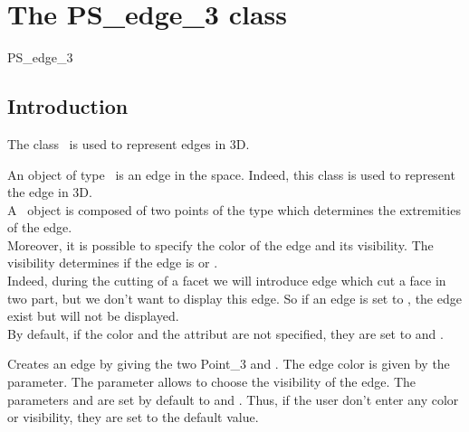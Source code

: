 
\chapter{The PS\_edge\_3 class}

\begin{ccClass} {PS_edge_3}

\section{Introduction}

The class \ccClassName\ is used to represent edges in 3D.

\ccDefinition 

	An object of type \ccClassName\ is an edge in the space.
Indeed, this class is used to represent the edge in 3D. \\
A \ccClassName\ object is composed of two points of the  type which determines
the extremities of the edge. \\
Moreover, it is possible to specify the color of the edge and its
visibility. 
The visibility determines if the edge is  or . \\
Indeed, during the cutting of a facet we will introduce edge which cut a
face in two part, but we don't want to display this edge. So if an edge
is set to  , the edge exist but will not be displayed. \\
By default, if the color and the attribut are not specified, they are
set to   and  .


\ccTypes

\ccGlue
{}
\ccGlue
{}
\ccGlue
{}
\ccGlue
{}

\ccCreation
{}

 {Creates an edge by giving
the two Point\_3  and . The edge color is given by the 
  parameter. The parameter   allows to choose the visibility of
the edge. The parameters   and   are set by default to
  and . Thus, if the user don't enter any 
color or visibility, they are set to the default value.}


\end{ccClass}
